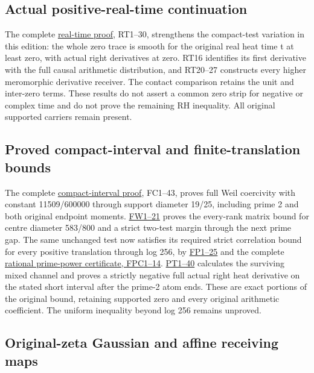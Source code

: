 \documentclass[
  10pt,
  a4paper,
]{article}
\begin{document}
\subsection{Actual positive-real-time
continuation}\label{actual-positive-real-time-continuation}

The complete \href{REAL_TIME_HEAT_TRACE_DERIVATION.md}{real-time proof},
RT1--30, strengthens the compact-test variation in this edition: the
whole zero trace is smooth for the original real heat time t at least
zero, with actual right derivatives at zero. RT16 identifies its first
derivative with the full causal arithmetic distribution, and RT20--27
constructs every higher meromorphic derivative receiver. The contact
comparison retains the unit and inter-zero terms. These results do not
assert a common zero strip for negative or complex time and do not prove
the remaining RH inequality. All original supported carriers remain
present.

\subsection{Proved compact-interval and finite-translation
bounds}\label{proved-compact-interval-and-finite-translation-bounds}

The complete \href{FIRST_PRIME_FULL_WEIL_COERCIVITY.md}{compact-interval
proof}, FC1--43, proves full Weil coercivity with constant 11509/600000
through support diameter 19/25, including prime 2 and both original
endpoint moments. \href{FIRST_PRIME_WINDOW_BOUND.md}{FW1--21} proves the
every-rank matrix bound for centre diameter 583/800 and a strict
two-test margin through the next prime gap. The same unchanged test now
satisfies its required strict correlation bound for every positive
translation through log 256, by
\href{FINITE_PRIME_WINDOW_EXTENSION.md}{FP1--25} and the complete
\href{FINITE_PRIME_WINDOW_COEFFICIENT_CERTIFICATE.md}{rational
prime-power certificate, FPC1--14}.
\href{PRIME_TWO_HEAT_TAIL_DERIVATION.md}{PT1--40} calculates the
surviving mixed channel and proves a strictly negative full actual right
heat derivative on the stated short interval after the prime-2 atom
ends. These are exact portions of the original bound, retaining
supported zero and every original arithmetic coefficient. The uniform
inequality beyond log 256 remains unproved.

\subsection{Original-zeta Gaussian and affine receiving
maps}\label{original-zeta-gaussian-and-affine-receiving-maps}
\end{document}

